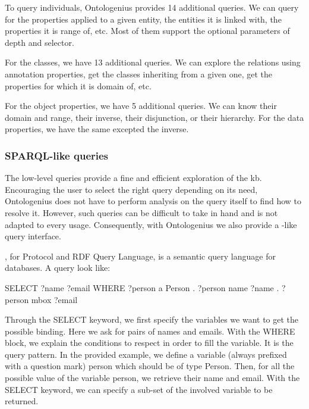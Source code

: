 To query individuals, Ontologenius provides 14 additional queries. We can query for the properties applied to a given entity, the entities it is linked with, the properties it is range of, etc. Most of them support the optional parameters of depth and selector.

For the classes, we have 13 additional queries. We can explore the relations using annotation properties, get the classes inheriting from a given one, get the properties for which it is domain of, etc.

For the object properties, we have 5 additional queries. We can know their domain and range, their inverse, their disjunction, or their hierarchy. For the data properties, we have the same excepted the inverse.

\subsubsection{SPARQL-like queries}

The low-level queries provide a fine and efficient exploration of the \acrshort{kb}. Encouraging the user to select the right query depending on its need, Ontologenius does not have to perform analysis on the query itself to find how to resolve it. However, such queries can be difficult to take in hand and is not adapted to every usage. Consequently, with Ontologenius we also provide a \sparql{}-like query interface.

\sparql{}, for \sparql{} Protocol and RDF Query Language, is a semantic query language for databases. A \sparql{} query look like:

\begin{minipage}{\textwidth}
\begin{verbatimtab}
SELECT ?name 
       ?email
WHERE
  {
    ?person  a     Person .
    ?person  name  ?name .
    ?person  mbox  ?email
  }
\end{verbatimtab}
\end{minipage}

Through the SELECT keyword, we first specify the variables we want to get the possible binding. Here we ask for pairs of names and emails. With the WHERE block, we explain the conditions to respect in order to fill the variable. It is the query pattern. In the provided example, we define a variable (always prefixed with a question mark) person which should be of type Person. Then, for all the possible value of the variable person, we retrieve their name and email. With the SELECT keyword, we can specify a sub-set of the involved variable to be returned.

